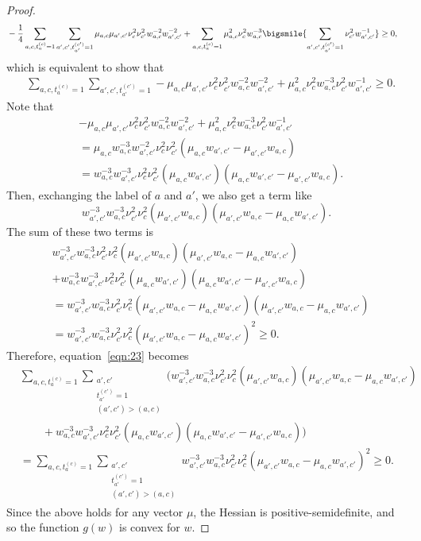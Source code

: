 \documentclass{article}
\newcommand{\1}{\mathbf{1}}
\begin{document}
\begin{proof}
{\begin{align*}
    &-\frac{1}{4}\sum_{a,c,t_a^{(c)}=1}\sum_{a',c',t_{a'}^{(c')}=1} \mu_{a,c}\mu_{a',c'} \nu_{c}^2\nu_{c'}^2 w_{a,c}^{-2} w_{a',c'}^{-2}+\sum_{a,c,t_a^{(c)}=1}\mu_{a,c}^2\nu_c^2w_{a,c}^{-3}\bigsmile{\sum_{a',c',t_{a'}^{(c')}=1}\nu_{c'}^2w_{a',c'}^{-1}}\geq 0,
\end{align*}
}
which is equivalent to show that
\begin{align}
    &\sum_{a,c,t_a^{(c)}=1}\sum_{a',c',t_{a'}^{(c')}=1} -\mu_{a,c}\mu_{a',c'} \nu_{c}^2\nu_{c'}^2 w_{a,c}^{-2} w_{a',c'}^{-2}+\mu_{a,c}^2\nu_c^2w_{a,c}^{-3}\nu_{c'}^2w_{a',c'}^{-1}\geq 0.\label{eqn:23}
\end{align}
Note that 
\begin{align*}
    &-\mu_{a,c}\mu_{a',c'} \nu_{c}^2\nu_{c'}^2 w_{a,c}^{-2} w_{a',c'}^{-2}+\mu_{a,c}^2\nu_c^2w_{a,c}^{-3}\nu_{c'}^2w_{a',c'}^{-1}\\
    &= \mu_{a,c}w_{a,c}^{-3}w_{a',c'}^{-2}\nu_c^2\nu_{c'}^2(\mu_{a,c}w_{a',c'}-\mu_{a',c'}w_{a,c})\\
    &= w_{a,c}^{-3}w_{a',c'}^{-3}\nu_c^2\nu_{c'}^2(\mu_{a,c}w_{a',c'})(\mu_{a,c}w_{a',c'}-\mu_{a',c'}w_{a,c}).
\end{align*}
Then, exchanging the label of $a$ and $a'$, we also get a term like $$w_{a',c'}^{-3}w_{a,c}^{-3}\nu_{c'}^2\nu_c^2(\mu_{a',c'}w_{a,c})(\mu_{a',c'}w_{a,c}-\mu_{a,c}w_{a',c'}).$$ The sum of these two terms is 
\begin{align*}
    &w_{a',c'}^{-3}w_{a,c}^{-3}\nu_{c'}^2\nu_c^2(\mu_{a',c'}w_{a,c})(\mu_{a',c'}w_{a,c}-\mu_{a,c}w_{a',c'})\\
    &+w_{a,c}^{-3}w_{a',c'}^{-3}\nu_c^2\nu_{c'}^2(\mu_{a,c}w_{a',c'})(\mu_{a,c}w_{a',c'}-\mu_{a',c'}w_{a,c})\\
    &= w_{a',c'}^{-3}w_{a,c}^{-3}\nu_{c'}^2\nu_c^2(\mu_{a',c'}w_{a,c}-\mu_{a,c}w_{a',c'})(\mu_{a',c'}w_{a,c}-\mu_{a,c}w_{a',c'})\\
    &= w_{a',c'}^{-3}w_{a,c}^{-3}\nu_{c'}^2\nu_c^2(\mu_{a',c'}w_{a,c}-\mu_{a,c}w_{a',c'})^2\geq 0.
\end{align*}
Therefore, equation~\ref{eqn:23} becomes 
\begin{align*}
    &\sum_{a,c,t_a^{(c)}=1}\sum_{\substack{a',c'\\ t_{a'}^{(c')}=1\\ (a',c')>(a,c)}}(w_{a',c'}^{-3}w_{a,c}^{-3}\nu_{c'}^2\nu_c^2(\mu_{a',c'}w_{a,c})(\mu_{a',c'}w_{a,c}-\mu_{a,c}w_{a',c'})\\
    &\qquad+w_{a,c}^{-3}w_{a',c'}^{-3}\nu_c^2\nu_{c'}^2(\mu_{a,c}w_{a',c'})(\mu_{a,c}w_{a',c'}-\mu_{a',c'}w_{a,c}))\\
    &= \sum_{a,c,t_a^{(c)}=1}\sum_{\substack{a',c'\\ t_{a'}^{(c')}=1\\ (a',c')>(a,c)}}w_{a',c'}^{-3}w_{a,c}^{-3}\nu_{c'}^2\nu_c^2(\mu_{a',c'}w_{a,c}-\mu_{a,c}w_{a',c'})^2\geq 0.
\end{align*}
Since the above holds for any vector $\mu$, the Hessian is positive-semidefinite, and so the function $g(w)$ is convex for $w$. 
\end{proof}
\end{document}
